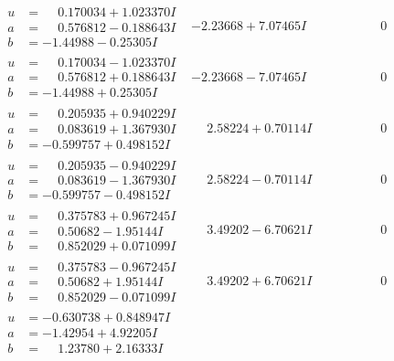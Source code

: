 \documentclass[1p]{elsarticle_modified}
\theoremstyle{definition}
\begin{document}
$$\begin{array}{c|c|c}
\begin{aligned}
u &= \phantom{-}0.170034 + 1.023370 I \\
a &= \phantom{-}0.576812 - 0.188643 I \\
b &= -1.44988 - 0.25305 I\end{aligned}
 & -2.23668 + 7.07465 I & \phantom{-0.000000 } 0 \\ \hline\begin{aligned}
u &= \phantom{-}0.170034 - 1.023370 I \\
a &= \phantom{-}0.576812 + 0.188643 I \\
b &= -1.44988 + 0.25305 I\end{aligned}
 & -2.23668 - 7.07465 I & \phantom{-0.000000 } 0 \\ \hline\begin{aligned}
u &= \phantom{-}0.205935 + 0.940229 I \\
a &= \phantom{-}0.083619 + 1.367930 I \\
b &= -0.599757 + 0.498152 I\end{aligned}
 & \phantom{-}2.58224 + 0.70114 I & \phantom{-0.000000 } 0 \\ \hline\begin{aligned}
u &= \phantom{-}0.205935 - 0.940229 I \\
a &= \phantom{-}0.083619 - 1.367930 I \\
b &= -0.599757 - 0.498152 I\end{aligned}
 & \phantom{-}2.58224 - 0.70114 I & \phantom{-0.000000 } 0 \\ \hline\begin{aligned}
u &= \phantom{-}0.375783 + 0.967245 I \\
a &= \phantom{-}0.50682 - 1.95144 I \\
b &= \phantom{-}0.852029 + 0.071099 I\end{aligned}
 & \phantom{-}3.49202 - 6.70621 I & \phantom{-0.000000 } 0 \\ \hline\begin{aligned}
u &= \phantom{-}0.375783 - 0.967245 I \\
a &= \phantom{-}0.50682 + 1.95144 I \\
b &= \phantom{-}0.852029 - 0.071099 I\end{aligned}
 & \phantom{-}3.49202 + 6.70621 I & \phantom{-0.000000 } 0 \\ \hline\begin{aligned}
u &= -0.630738 + 0.848947 I \\
a &= -1.42954 + 4.92205 I \\
b &= \phantom{-}1.23780 + 2.16333 I\end{aligned}

\end{array}$$
\end{document}
